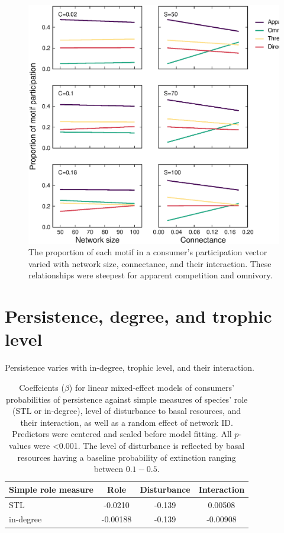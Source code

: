 \documentclass[12pt]{article}
\begin{document}
\begin{spacing}{2.0}
    \begin{figure}[h!]
        \centering
        \includegraphics[height=.4\textheight]{figures/participation_vs_SC.eps}
        \caption{The proportion of each motif in a consumer's participation vector varied with network size, connectance, and their interaction. These relationships were steepest for apparent competition and omnivory.}
        \label{fig:roles_vs_SC}
    \end{figure}
\clearpage 

\section{Persistence, degree, and trophic level}


    Persistence varies with in-degree, trophic level, and their interaction.

    \begin{table}[h!]
        \caption{Coeffcients ($\beta$) for linear mixed-effect models of consumers' probabilities of persistence against simple measures of species' role (STL or in-degree), level of disturbance to basal resources, and their interaction, as well as a random effect of network ID. Predictors were centered and scaled before model fitting. All $p$-values were \textless0.001. The level of disturbance is reflected by basal resources having a baseline probability of extinction ranging between $0.1 - 0.5$.}
        \label{tab:per_vs_TLdeg}
        \centering
        \begin{tabular}{l|c  c  c |}
            Simple role measure & Role & Disturbance & Interaction \\
            \hline
            STL & -0.0210 & -0.139 & 0.00508 \\
            in-degree & -0.00188 & -0.139 & -0.00908 \\
        \end{tabular}
    \end{table}



\end{spacing}
\end{document}
